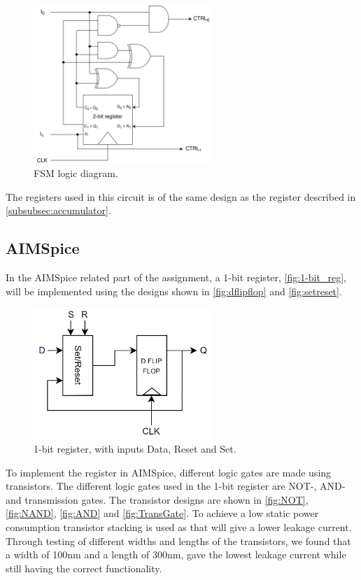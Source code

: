 \begin{figure}[H]
    \centering
    \includegraphics[width=0.6\textwidth]{Figures/logic diagram.png}
    \caption{FSM logic diagram.}
    \label{fig:fsm_logic_diagram}
\end{figure}

\noindent
The registers used in this circuit is of the same design as the register described in \autoref{subsubsec:accumulator}.

\subsection{AIMSpice}
\label{subsec:aimspicemethod}

In the AIMSpice related part of the assignment, a 1-bit register, \autoref{fig:1-bit_reg}, will be implemented using the designs shown in \autoref{fig:dflipflop} and \ref{fig:setreset}.

\begin{figure}[H]
    \centering
    \includegraphics[width=0.6\textwidth]{Figures/1-bit register.png}
    \caption{1-bit register, with inputs Data, Reset and Set.}
    \label{fig:1-bit_reg}
\end{figure}

To implement the register in AIMSpice, different logic gates are made using transistors. The different logic gates used in the 1-bit register are NOT-, AND- and transmission gates. The transistor designs are shown in \autoref{fig:NOT}, \ref{fig:NAND}, \ref{fig:AND} and \ref{fig:TransGate}. To achieve a low static power consumption transistor stacking is used as that will give a lower leakage current. Through testing of different widths and lengths of the transistors, we found that a width of 100nm and a length of 300nm, gave the lowest leakage current while still having the correct functionality. 

